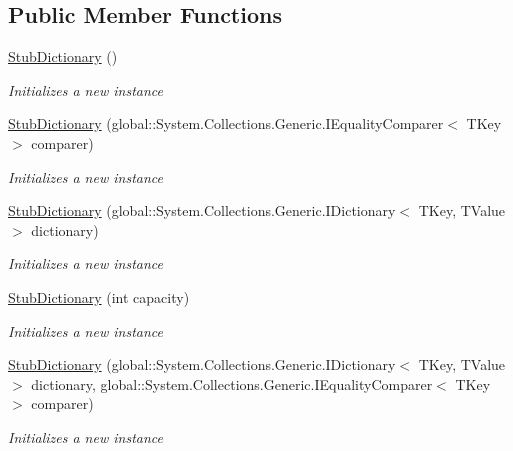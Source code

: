 \subsection*{Public Member Functions}
\begin{DoxyCompactItemize}
\item 
\hyperlink{class_system_1_1_collections_1_1_generic_1_1_fakes_1_1_stub_dictionary_3_01_t_key_00_01_t_value_01_4_acad8f9547a7bfdd7387d6a094e06ffaa}{Stub\-Dictionary} ()
\begin{DoxyCompactList}\small\item\em Initializes a new instance\end{DoxyCompactList}\item 
\hyperlink{class_system_1_1_collections_1_1_generic_1_1_fakes_1_1_stub_dictionary_3_01_t_key_00_01_t_value_01_4_a8fec359083ed9b432dc97f98249c2078}{Stub\-Dictionary} (global\-::\-System.\-Collections.\-Generic.\-I\-Equality\-Comparer$<$ T\-Key $>$ comparer)
\begin{DoxyCompactList}\small\item\em Initializes a new instance\end{DoxyCompactList}\item 
\hyperlink{class_system_1_1_collections_1_1_generic_1_1_fakes_1_1_stub_dictionary_3_01_t_key_00_01_t_value_01_4_acfc183ece31c001435b281c0c75ed83b}{Stub\-Dictionary} (global\-::\-System.\-Collections.\-Generic.\-I\-Dictionary$<$ T\-Key, T\-Value $>$ dictionary)
\begin{DoxyCompactList}\small\item\em Initializes a new instance\end{DoxyCompactList}\item 
\hyperlink{class_system_1_1_collections_1_1_generic_1_1_fakes_1_1_stub_dictionary_3_01_t_key_00_01_t_value_01_4_a5aa46fbd364018d0b4c9cb323e600321}{Stub\-Dictionary} (int capacity)
\begin{DoxyCompactList}\small\item\em Initializes a new instance\end{DoxyCompactList}\item 
\hyperlink{class_system_1_1_collections_1_1_generic_1_1_fakes_1_1_stub_dictionary_3_01_t_key_00_01_t_value_01_4_a601cd43f3aba81806a78b746863422d3}{Stub\-Dictionary} (global\-::\-System.\-Collections.\-Generic.\-I\-Dictionary$<$ T\-Key, T\-Value $>$ dictionary, global\-::\-System.\-Collections.\-Generic.\-I\-Equality\-Comparer$<$ T\-Key $>$ comparer)
\begin{DoxyCompactList}\small\item\em Initializes a new instance\end{DoxyCompactList}\item 

\end{DoxyCompactItemize}
